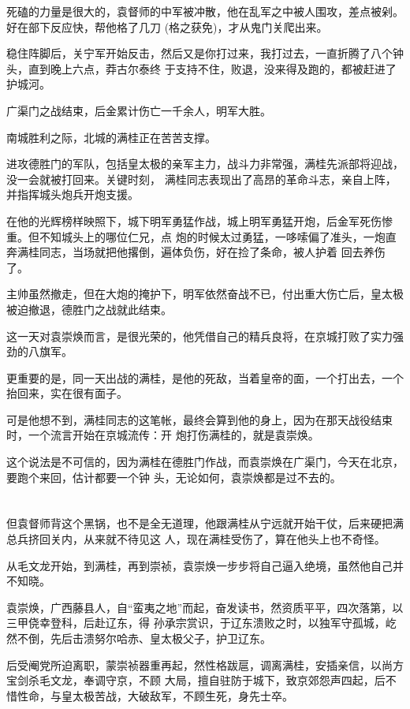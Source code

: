 \documentclass[11pt,a4paper,onecolumn]{article}
\begin{document}
死磕的力量是很大的，袁督师的中军被冲散，他在乱军之中被人围攻，差点被剁。好在部下反应快，帮他格了几刀
(格之获免)，才从鬼门关爬出来。

稳住阵脚后，关宁军开始反击，然后又是你打过来，我打过去，一直折腾了八个钟头，直到晚上六点，莽古尔泰终
于支持不住，败退，没来得及跑的，都被赶进了护城河。

广渠门之战结束，后金累计伤亡一千余人，明军大胜。

南城胜利之际，北城的满桂正在苦苦支撑。

进攻德胜门的军队，包括皇太极的亲军主力，战斗力非常强，满桂先派部将迎战，没一会就被打回来。关键时刻，
满桂同志表现出了高昂的革命斗志，亲自上阵，并指挥城头炮兵开炮支援。

在他的光辉榜样映照下，城下明军勇猛作战，城上明军勇猛开炮，后金军死伤惨重。但不知城头上的哪位仁兄，点
炮的时候太过勇猛，一哆嗦偏了准头，一炮直奔满桂同志，当场就把他撂倒，遍体负伤，好在捡了条命，被人护着
回去养伤了。

主帅虽然撤走，但在大炮的掩护下，明军依然奋战不已，付出重大伤亡后，皇太极被迫撤退，德胜门之战就此结束。

这一天对袁崇焕而言，是很光荣的，他凭借自己的精兵良将，在京城打败了实力强劲的八旗军。

更重要的是，同一天出战的满桂，是他的死敌，当着皇帝的面，一个打出去，一个抬回来，实在很有面子。

可是他想不到，满桂同志的这笔帐，最终会算到他的身上，因为在那天战役结束时，一个流言开始在京城流传：开
炮打伤满桂的，就是袁崇焕。

这个说法是不可信的，因为满桂在德胜门作战，而袁崇焕在广渠门，今天在北京，要跑个来回，估计都要一个钟
头，无论如何，袁崇焕都是过不去的。

\section[\thesection]{}

但袁督师背这个黑锅，也不是全无道理，他跟满桂从宁远就开始干仗，后来硬把满总兵挤回关内，从来就不待见这
人，现在满桂受伤了，算在他头上也不奇怪。

从毛文龙开始，到满桂，再到崇祯，袁崇焕一步步将自己逼入绝境，虽然他自己并不知晓。

袁崇焕，广西藤县人，自``蛮夷之地''而起，奋发读书，然资质平平，四次落第，以三甲侥幸登科，后赴辽东，得
孙承宗赏识，于辽东溃败之时，以独军守孤城，屹然不倒，先后击溃努尔哈赤、皇太极父子，护卫辽东。

后受阉党所迫离职，蒙崇祯器重再起，然性格跋扈，调离满桂，安插亲信，以尚方宝剑杀毛文龙，奉调守京，不顾
大局，擅自驻防于城下，致京郊怨声四起，后不惜性命，与皇太极苦战，大破敌军，不顾生死，身先士卒。
\end{document}
